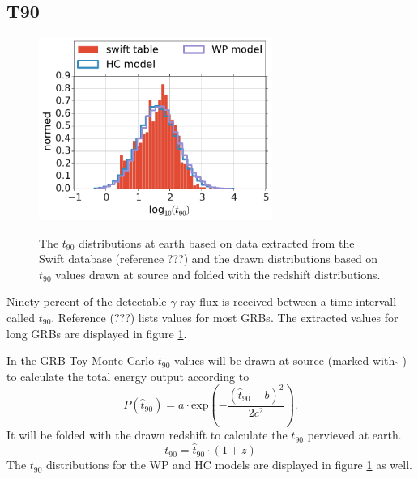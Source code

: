 \subsection{T90}
\begin{figure}[ht]
\centering
 \captionsetup{width=.68\textwidth}
{\includegraphics[width=0.68\textwidth]{fig/t90earth.pdf}}
    \caption{The $t_{90}$ distributions at earth based on data extracted from
the Swift database (reference ???) and the drawn distributions based on
$t_{90}$ values drawn at source and folded with the redshift distributions.}
\label{fig:t90earth}
\end{figure}
Ninety percent of the detectable $\gamma$-ray flux is received between a
time intervall called $t_{90}$. Reference (???) lists values for most GRBs.
The extracted values for long GRBs are displayed in figure \ref{fig:t90earth}. 

In the GRB Toy Monte Carlo $t_{90}$ values will be drawn at source (marked with
$\hat{}$ ) to
calculate the total energy output according to
\begin{equation}
 P\left(\hat{t}_{90}\right) = a \cdot \text{exp} \left( -
\frac{\left(\hat{t}_{90} -
b \right)^2}{2 c^2} \right).
\label{eq:t90dist}
\end{equation}
It will be folded with the drawn
redshift to calculate the $t_{90}$ pervieved at earth.
\begin{equation}
 t_{90} = \hat{t}_{90} \cdot \left( 1 + z \right)
\label{eq:t90earth}
\end{equation}
The $t_{90}$ distributions for the WP and HC models are displayed in figure
\ref{fig:t90earth} as well.



